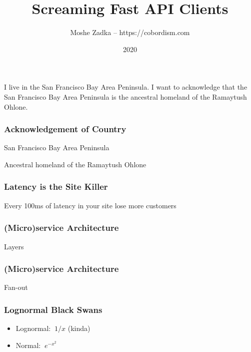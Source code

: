 \usepackage{hyperref}
\usepackage{graphicx}
\usepackage{listings}
\usepackage{textcomp}
\usepackage{fancyvrb}

\title{Screaming Fast API Clients}
\author{Moshe Zadka -- https://cobordism.com}
\date{2020}


\begin{titlepage}
\maketitle
\end{titlepage}

\frame{\titlepage}

I live in the San Francisco Bay Area Peninsula.
I want to acknowledge that the San Francisco Bay Area Peninsula
is the ancestral homeland of the Ramaytush Ohlone.

\begin{frame}
\frametitle{Acknowledgement of Country}

San Francisco Bay Area Peninsula

Ancestral homeland of the Ramaytush Ohlone

\end{frame}

\begin{frame}
\frametitle{Latency is the Site Killer}

Every 100ms of latency in your site lose more customers

\end{frame}

\begin{frame}
\frametitle{(Micro)service Architecture}

Layers

\end{frame}

\begin{frame}
\frametitle{(Micro)service Architecture}

Fan-out

\end{frame}

\begin{frame}
\frametitle{Lognormal Black Swans}

\begin{itemize}
\item Lognormal: $~1/x$ (kinda)
\item Normal: $~e^{-x^2}$
\end{itemize}

\end{frame}

